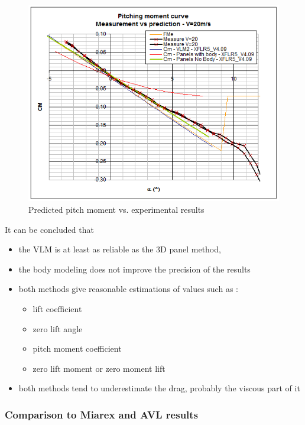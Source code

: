 \documentclass[a4paper,twoside,12pt,dvips]{article}
\begin{document}
\begin{figure}[htbp]
  \includegraphics[width=0.8\linewidth]{img-39}\centering 
  \caption{Predicted pitch moment vs. experimental results}
  \label{fig:predicted_pitch_moment_vs_experimental_results}
\end{figure}

It can be concluded that

\begin{itemize}
\item the VLM is at least as reliable as the 3D panel method,
\item the body modeling does not improve the precision of the
results
\item both methods give reasonable estimations of values such
as :
\begin{itemize}
\item lift coefficient
\item zero lift angle
\item pitch moment coefficient
\item zero lift moment or zero moment lift
\end{itemize}
\item both methods tend to underestimate the drag, probably
the viscous part of it
\end{itemize}

\subsubsection{Comparison to Miarex and AVL results}
\end{document}
